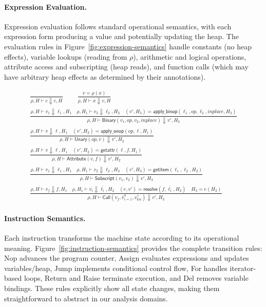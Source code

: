 \paragraph{Expression Evaluation.}
Expression evaluation follows standard operational semantics, with each expression form producing a value and potentially updating the heap. The evaluation rules in Figure~\ref{fig:expression-semantics} handle constants (no heap effects), variable lookups (reading from $\rho$), arithmetic and logical operations, attribute access and subscripting (heap reads), and function calls (which may have arbitrary heap effects as determined by their annotations).

\begin{figure*}[t]
\centering
\[
\begin{array}{c}
\frac{}{\rho,H \vdash c \Downarrow c,H}
\qquad
\frac{v=\rho(x)}{\rho,H \vdash x \Downarrow v,H}
\\[1.5ex]
\frac{\rho,H \vdash v_1 \Downarrow \ell_1,H_1 \quad
      \rho,H_1 \vdash v_2 \Downarrow \ell_2,H_2 \quad
      (v',H_3) = \mathsf{apply\_binop}(\ell_1,op,\ell_2,inplace,H_2)}
     {\rho,H \vdash \mathsf{Binary}(v_1,op,v_2,inplace) \Downarrow v',H_3}
\\[1.5ex]
\frac{\rho,H \vdash v \Downarrow \ell,H_1 \quad
      (v',H_2) = \mathsf{apply\_unop}(op,\ell,H_1)}
     {\rho,H \vdash \mathsf{Unary}(op,v) \Downarrow v',H_2}
\\[1.5ex]
\frac{\rho,H \vdash v \Downarrow \ell,H_1 \quad
      (v',H_2) = \mathsf{getattr}(\ell,f,H_1)}
     {\rho,H \vdash \mathsf{Attribute}(v,f) \Downarrow v',H_2}
\\[1.5ex]
\frac{\rho,H \vdash v_1 \Downarrow \ell_1,H_1 \quad
      \rho,H_1 \vdash v_2 \Downarrow \ell_2,H_2 \quad
      (v',H_3) = \mathsf{getitem}(\ell_1,\ell_2,H_2)}
     {\rho,H \vdash \mathsf{Subscript}(v_1,v_2) \Downarrow v',H_3}
\\[1.5ex]
\frac{\rho,H \vdash v_f \Downarrow f,H_1 \quad
      \rho,H_1 \vdash \overline{v_i} \Downarrow \overline{\ell_i},H_2 \quad
      (e,v') = \mathsf{resolve}(f,\overline{\ell_i},H_2) \quad
      H_3 = e(H_2)}
     {\rho,H \vdash \mathsf{Call}(v_f,\overline{v}_{i=1}^{n},v_{kw}^{?}) \Downarrow v',H_3}
\end{array}
\]
\caption{Semantics of Expression Evaluation}
\label{fig:expression-semantics}
\end{figure*}

\paragraph{Instruction Semantics.}
Each instruction transforms the machine state according to its operational meaning. Figure~\ref{fig:instruction-semantics} provides the complete transition rules: \textsf{Nop} advances the program counter, \textsf{Assign} evaluates expressions and updates variables/heap, \textsf{Jump} implements conditional control flow, \textsf{For} handles iterator-based loops, \textsf{Return} and \textsf{Raise} terminate execution, and \textsf{Del} removes variable bindings. These rules explicitly show all state changes, making them straightforward to abstract in our analysis domains.


